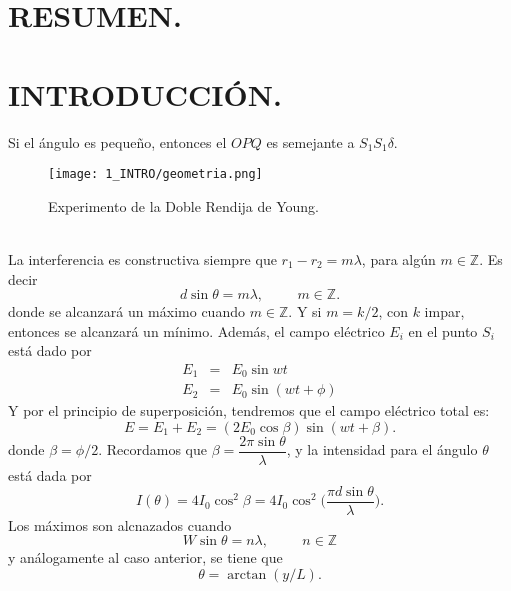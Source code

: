 \documentclass[12pt,a4paper]{article}
\begin{document}
\portada

\section{RESUMEN.} %

\section{INTRODUCCIÓN.} %
Si el ángulo es pequeño, entonces el \(OPQ\) es semejante a \(S_1S_1 \delta\).
\begin{figure}[hbtp!]
	\centering
	\texttt{[image: 1\_INTRO/geometria.png]}
	\caption{Experimento de la Doble Rendija de Young.}
	\label{fig:constructiva}
\end{figure}\\
La interferencia es constructiva siempre que \(r_1-r_2 = m \lambda\), para algún \(m \in \mathds{Z}\). Es decir
\begin{equation}
	d \sin \theta = m \lambda , \hspace{1cm} m \in \mathds{Z} .
	\label{eq:young}
\end{equation}
donde se alcanzará un máximo cuando \(m \in \mathds{Z}\). Y si \(m=k/2\), con \(k\) impar, entonces se alcanzará un mínimo. Además, el campo eléctrico \(E_i\) en el punto \(S_i\) está dado por
\begin{equation}
	\begin{array}{rcl}
		E_1 & = & E_0 \sin wt \\[2mm]
		E_2 & = & E_0 \sin (wt+ \phi)
	\end{array}
	\label{eq:campos_electricos}
\end{equation}
Y por el principio de superposición, tendremos que el campo eléctrico total es:
\begin{equation}
	E = E_1 + E_2 = (2E_0 \cos \beta) \sin (wt+ \beta).
	\label{eq:campo_total}
\end{equation}
donde \(\beta = \phi /2\). Recordamos que \(\beta = \dfrac{2 \pi \sin \theta}{\lambda}\), y la intensidad para el ángulo \(\theta\) está dada por
\begin{equation}
	I(\theta) = 4I_0 \cos ^2 \beta = 4I_0 \cos ^2 \bigg(\dfrac{\pi d \sin \theta}{\lambda}\bigg).
	\label{eq:intensidad}
\end{equation}
Los máximos son alcnazados cuando
\begin{equation}
	W \sin \theta = n \lambda , \hspace{1cm} n \in \mathds{Z}
	\label{eq:maximos}
\end{equation}
y análogamente al caso anterior, se tiene que
\begin{equation}
	\theta = \arctan (y/L).
	\label{eq:theta}
\end{equation}
\end{document}
